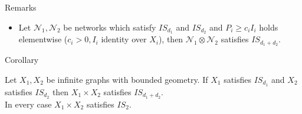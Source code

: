 \documentclass{beamer}\usepackage[]{graphicx}\usepackage[]{color}
\begin{document}
\begin{frame}[fragile]{Remarks}
\begin{itemize}
\item Let $\mathcal{N}_1, \mathcal{N}_2$ be networks which satisfy $IS_{d_1}$ and $IS_{d_2}$ and $P_i \ge c_i I_i$ holds elementwise ($c_i > 0, I_i$ identity over $X_i$), then $\mathcal{N}_1 \otimes \mathcal{N}_2$ satisfies $IS_{d_1+d_2}$.
\end{itemize}
\end{frame}

\begin{frame}[fragile]{Corollary}
\begin{corollary}
Let $X_1, X_2$ be infinite graphs with bounded geometry. If $X_1$ satisfies $IS_{d_1}$ and $X_2$ satisfies $IS_{d_2}$ then $X_1 \times X_2$ satisfies $IS_{d_1+d_2}$.\\
In every case $X_1 \times X_2$ satisfies $IS_2$.
\end{corollary}
\end{frame}

\end{document}
